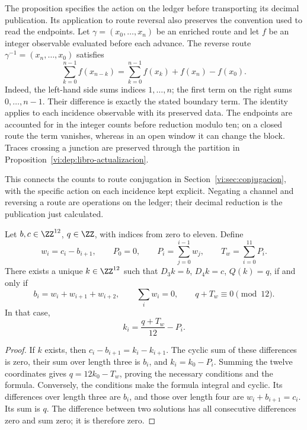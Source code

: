 The proposition specifies the action on the ledger before transporting
its decimal publication. Its application to route reversal
also preserves the convention used to read the endpoints. Let
\(\gamma=(x_0,\ldots,x_n)\) be an enriched route and let \(f\) be an
integer observable evaluated before each advance. The reverse route
\(\gamma^{-1}=(x_n,\ldots,x_0)\) satisfies
\begin{equation}
 \sum_{k=0}^{n-1}f(x_{n-k})
 =\sum_{k=0}^{n-1}f(x_k)+f(x_n)-f(x_0).
 \label{vi:dep:conjugacion-frontera}
\end{equation}
Indeed, the left-hand side sums indices \(1,\ldots,n\);
the first term on the right sums \(0,\ldots,n-1\). Their difference
is exactly the stated boundary term. The identity applies
to each incidence observable with its preserved data. The endpoints
are accounted for in the integer counts before reduction modulo ten;
on a closed route the term vanishes, whereas in an open
window it can change the block. Traces crossing a junction
are preserved through the partition in
Proposition~\ref{vi:dep:libro-actualizacion}.

This connects the counts to route conjugation in
Section~\ref{vi:sec:conjugacion}, with the specific action
on each incidence kept explicit. Negating a channel and reversing
a route are operations on the ledger; their decimal reduction is the
publication just calculated.

\begin{proposition}
\label{vi:dep:imagen-integral}
Let \(b,c\in\ZZ^{12}\), \(q\in\ZZ\), with indices from zero to eleven.
Define
\[
 w_i=c_i-b_{i+1},\qquad P_0=0,\qquad
 P_i=\sum_{j=0}^{i-1}w_j,\qquad T_w=\sum_{i=0}^{11}P_i.
\]
There exists a unique \(k\in\ZZ^{12}\) such that
\(D_3k=b\), \(D_4k=c\), \(Q(k)=q\), if and only if
\begin{equation}
 b_i=w_i+w_{i+1}+w_{i+2},\qquad
 \sum_iw_i=0,\qquad q+T_w\equiv0\pmod{12}.
 \label{vi:dep:condiciones-imagen}
\end{equation}
In that case,
\begin{equation}
 k_i=\frac{q+T_w}{12}-P_i.
 \label{vi:dep:inversa-incidencial}
\end{equation}
\end{proposition}
\begin{proof}
If \(k\) exists, then
\(c_i-b_{i+1}=k_i-k_{i+1}\). The cyclic sum of these differences
is zero, their sum over length three is \(b_i\), and
\(k_i=k_0-P_i\). Summing the twelve coordinates gives
\(q=12k_0-T_w\), proving the necessary conditions and the formula.
Conversely, the conditions make the formula integral and
cyclic. Its differences over length three are \(b_i\), and those over
length four are \(w_i+b_{i+1}=c_i\). Its sum is \(q\).
The difference between two solutions has all consecutive
differences zero and sum zero; it is therefore zero.
\end{proof}

